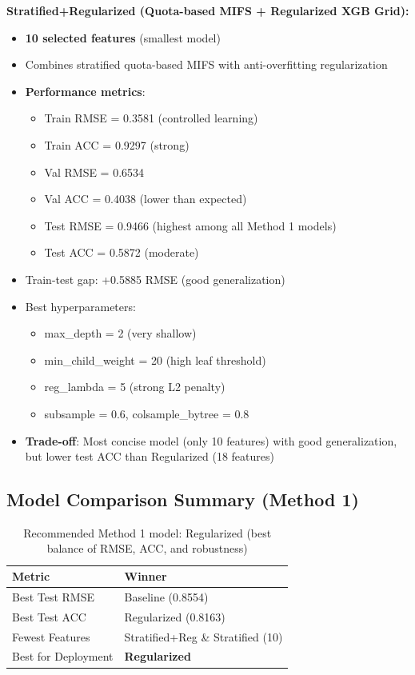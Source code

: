 \textbf{Stratified+Regularized (Quota-based MIFS + Regularized XGB Grid):}
\begin{itemize}
\item \textbf{10 selected features} (smallest model)
\item Combines stratified quota-based MIFS with anti-overfitting regularization
\item \textbf{Performance metrics}:
\begin{itemize}
\item Train RMSE = 0.3581 (controlled learning)
\item Train ACC = 0.9297 (strong)
\item Val RMSE = 0.6534
\item Val ACC = 0.4038 (lower than expected)
\item Test RMSE = 0.9466 (highest among all Method 1 models)
\item Test ACC = 0.5872 (moderate)
\end{itemize}
\item Train-test gap: +0.5885 RMSE (good generalization)
\item Best hyperparameters:
\begin{itemize}
\item max\_depth = 2 (very shallow)
\item min\_child\_weight = 20 (high leaf threshold)
\item reg\_lambda = 5 (strong L2 penalty)
\item subsample = 0.6, colsample\_bytree = 0.8
\end{itemize}
\item \textbf{Trade-off}: Most concise model (only 10 features) with good generalization, but lower test ACC than Regularized (18 features)
\end{itemize}

\subsection{Model Comparison Summary (Method 1)}

\begin{table}[H]
\centering
\caption{Recommended Method 1 model: Regularized (best balance of RMSE, ACC, and robustness)}
\label{tab:model_summary}
\normalsize
\renewcommand{\arraystretch}{1.2}
\begin{tabular}{|l|l|}
\hline
\textbf{Metric} & \textbf{Winner} \\
\hline
Best Test RMSE & Baseline (0.8554) \\
\hline
Best Test ACC & Regularized (0.8163) \\
\hline
Fewest Features & Stratified+Reg \& Stratified (10) \\
\hline
Best for Deployment & \textbf{Regularized} \\
\hline
\end{tabular}
\end{table}

